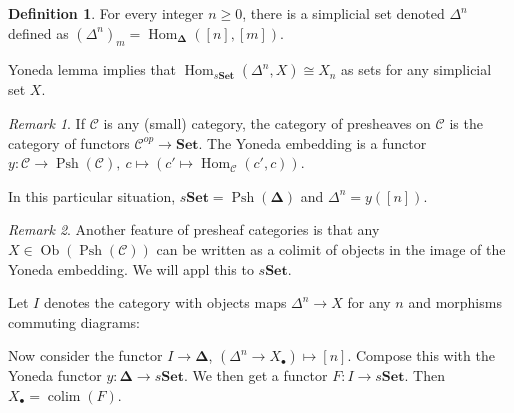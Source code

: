 \documentclass{article}
\theoremstyle{definition}
\newtheorem{defn}{Definition}[section]
\theoremstyle{remark}
\newtheorem{rem}{Remark}
\theoremstyle{plain}
\newcommand{\Hom}{\operatorname{Hom}}
\newcommand{\bdel}{\mathbf{\Delta}}
\newcommand{\bset}{\mathbf{Set}}
\begin{document}
\begin{defn}
    For every integer $n\ge 0$, there is a simplicial set denoted $\Delta^n$ defined as $(\Delta^n)_m=\Hom_\bdel([n],[m])$.
\end{defn}
Yoneda lemma implies that $\Hom_{s\bset}(\Delta^n,X)\cong X_n$ as sets for any simplicial set $X$.
\begin{rem}
    If $\mathscr{C}$ is any (small) category, the category of presheaves on $\mathscr C$ is the category of functors $\mathscr C^{op}\to\bset$. The Yoneda embedding is a functor $y:\mathscr C\to\operatorname{Psh}(\mathscr C),\ c\mapsto (c'\mapsto \Hom_{\mathscr C}(c',c))$.

    In this particular situation, $s\bset=\operatorname{Psh}(\bdel)$ and $\Delta^n=y([n])$.
\end{rem}
\begin{rem}
    Another feature of presheaf categories is that any $X\in\operatorname{Ob}(\operatorname{Psh}(\mathscr C))$ can be written as a colimit of objects in the image of the Yoneda embedding. We will appl this to $s\bset$.
\end{rem}
Let $I$ denotes the category with objects maps $\Delta^n\to X$ for any $n$ and morphisms commuting diagrams:
\begin{center}
\end{center}

Now consider the functor $I\to\bdel$, $(\Delta^n\to X_\bullet)\mapsto [n]$. Compose this with the Yoneda functor $y:\bdel\to s\bset$. We then get a functor $F:I\to s\bset$. Then $X_\bullet=\operatorname{colim}(F)$.
\end{document}
